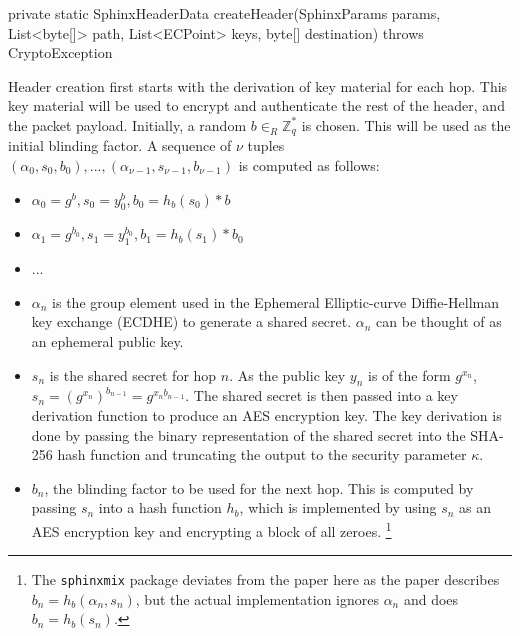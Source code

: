\documentclass[final,dissertation.tex]{subfiles}
\begin{document}
\begin{javacode}
private static SphinxHeaderData createHeader(SphinxParams params,
	List<byte[]> path,
	List<ECPoint> keys,
	byte[] destination) throws CryptoException
\end{javacode}

Header creation first starts with the derivation of key material for each hop. This key material will be used to encrypt and authenticate the rest of the header, and the packet payload. Initially, a random $b \in_R \mathbb{Z}^*_q$ is chosen. This will be used as the initial blinding factor. A sequence of $\nu$ tuples $(\alpha_0, s_0, b_0),...,(\alpha_{\nu-1}, s_{\nu-1}, b_{\nu-1})$ is computed as follows:
\\
\begin{itemize}
	\setlength\itemsep{-0.4em}
	\item $\alpha_0 = g^b, s_0 = y_0^b, b_0 = h_b(s_0)*b$
	\item $\alpha_1 = g^{b_0}, s_1 = y_1^{b_0}, b_1 = h_b(s_1)*b_0$
	\item ...
\end{itemize}

\begin{itemize}
	\item $\alpha_n$ is the group element used in the Ephemeral Elliptic-curve Diffie-Hellman key exchange (ECDHE) to generate a shared secret. $\alpha_n$ can be thought of as an ephemeral public key. 
	
	\item $s_n$ is the shared secret for hop $n$. 
	As the public key $y_n$ is of the form $g^{x_n}$, $s_n = (g^{x_n})^{b_{n-1}} = g^{{x_n}{b_{n-1}}}$. The shared secret is then passed into a key derivation function to produce an AES encryption key. The key derivation is done by passing the binary representation of the shared secret into the SHA-256 hash function and truncating the output to the security parameter $\kappa$.
	
	\item $b_n$, the blinding factor to be used for the next hop. This is computed by passing $s_n$ into a hash function $h_b$, which is implemented by using $s_n$ as an AES encryption key and encrypting a block of all zeroes. \footnote{The \verb|sphinxmix| package deviates from the paper here as the paper describes $b_n = h_b(\alpha_n, s_n)$, but the actual implementation ignores $\alpha_n$ and does $b_n = h_b(s_n)$.}
\end{itemize}
\end{document}
